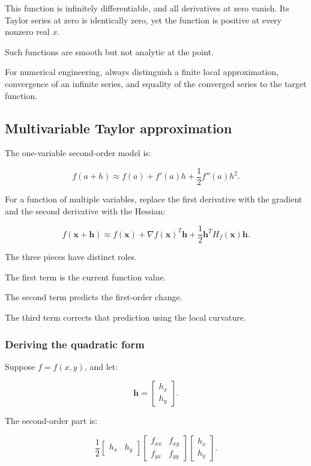 This function is infinitely differentiable, and all derivatives at zero vanish. Its Taylor series at zero is identically zero, yet the function is positive at every nonzero real \(x\).

Such functions are smooth but not analytic at the point.

For numerical engineering, always distinguish a finite local approximation, convergence of an infinite series, and equality of the converged series to the target function.

\subsection{Multivariable Taylor approximation}\label{02-foundations-ii-ch021-multivariable-taylor-approximation}

The one-variable second-order model is:

\[
f(a+h) \approx f(a)+f'(a)h+\frac12f''(a)h^2.
\]

For a function of multiple variables, replace the first derivative with the gradient and the second derivative with the Hessian:

\[
\boxed{ f(\mathbf x+\mathbf h) \approx f(\mathbf x) + \nabla f(\mathbf x)^T\mathbf h + \frac12\mathbf h^TH_f(\mathbf x)\mathbf h }.
\]

The three pieces have distinct roles.

The first term is the current function value.

The second term predicts the first-order change.

The third term corrects that prediction using the local curvature.

\subsubsection{Deriving the quadratic form}\label{02-foundations-ii-ch021-deriving-the-quadratic-form}

Suppose \(f=f(x,y)\), and let:

\[
\mathbf h= \begin{bmatrix}h_x\\h_y\end{bmatrix}.
\]

The second-order part is:

\[
\frac12 \begin{bmatrix}h_x&h_y\end{bmatrix} \begin{bmatrix} f_{xx}&f_{xy}\\ f_{yx}&f_{yy} \end{bmatrix} \begin{bmatrix}h_x\\h_y\end{bmatrix}.
\]

